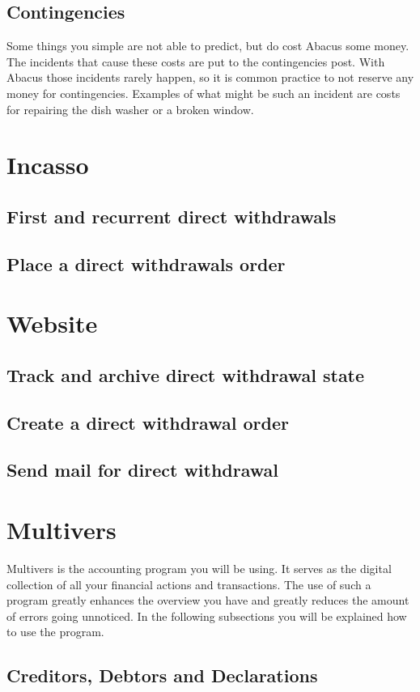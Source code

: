 \documentclass{report}
\begin{document}
\subsection{Contingencies}
Some things you simple are not able to predict, but do cost Abacus some money. The incidents that cause these costs are put to the contingencies post. With Abacus those incidents rarely happen, so it is common practice to not reserve any money for contingencies. Examples of what might be such an incident are costs for repairing the dish washer or a broken window.
\section{Incasso}
\subsection{First and recurrent direct withdrawals}
\subsection{Place a direct withdrawals order}
\section{Website}
\subsection{Track and archive direct withdrawal state}
\subsection{Create a direct withdrawal order}
\subsection{Send mail for direct withdrawal}
\section{Multivers}
Multivers is the accounting program you will be using. It serves as the digital collection of all your financial actions and transactions. The use of such a program greatly enhances the overview you have and greatly reduces the amount of errors going unnoticed. In the following subsections you will be explained how to use the program.
\subsection{Creditors, Debtors and Declarations}
\end{document}
